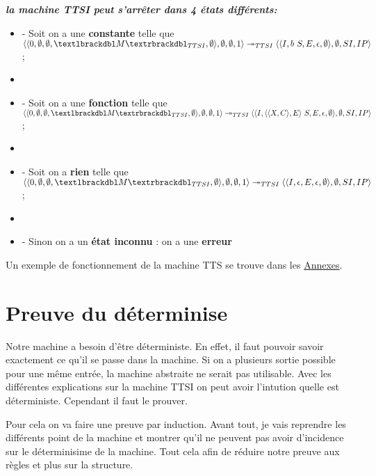 \documentclass[10pt,a4paper]{report}
\begin{document}
	
\textbf{\textit{la machine TTSI peut s'arrêter dans 4 états différents:}}
\smallbreak
\begin{itemize}
	\item[] - Soit on a une \textbf{constante} telle que 
	$\langle\langle 0,\emptyset,\emptyset,\textlbrackdbl M\textrbrackdbl_{TTSI},\emptyset\rangle,\emptyset,\emptyset,1\rangle 
	\twoheadrightarrow_{TTSI} 
	\langle\langle I,b~S,E,\epsilon,\emptyset\rangle,\emptyset,SI,IP\rangle$;
	\item[] 
	\item[] - Soit on a une \textbf{fonction} telle que
	$\langle\langle 0,\emptyset,\emptyset,\textlbrackdbl M\textrbrackdbl_{TTSI},\emptyset\rangle,\emptyset,\emptyset,1\rangle 
	\twoheadrightarrow_{TTSI} 
	\langle\langle I,\langle\langle X,C\rangle,E\rangle~S,E,\epsilon,\emptyset\rangle,\emptyset,SI,IP\rangle$;
	\item[] 
	\item[] - Soit on a \textbf{rien} telle que  
	$\langle\langle 0,\emptyset,\emptyset,\textlbrackdbl M\textrbrackdbl_{TTSI},\emptyset\rangle,\emptyset,\emptyset,1\rangle 
	\twoheadrightarrow_{TTSI} 
	\langle\langle I,\epsilon,E,\epsilon,\emptyset\rangle,\emptyset,SI,IP\rangle$;
	\item[]
	\item[] - Sinon on a un \textbf{état inconnu} : on a une \textbf{erreur} 
\end{itemize}
\bigbreak


 Un exemple de fonctionnement de la machine TTS se trouve dans les \hyperref[TTSI]{Annexes}.
\newpage
	
	\section{Preuve du déterminise}
	
	Notre machine a besoin d'être déterministe. En effet, il faut pouvoir savoir exactement ce qu'il se passe dans la machine. Si on a plusieurs sortie possible pour une même entrée, la machine abstraite ne serait pas utilisable. Avec les différentes explications sur la machine TTSI on peut avoir l'intution quelle est déterministe. Cependant il faut le prouver.
	\medbreak
	
	Pour cela on va faire une preuve par induction. Avant tout, je vais reprendre les différents point de la machine et montrer qu'il ne peuvent pas avoir d'incidence sur le déterminisime de la machine. Tout cela afin de réduire notre preuve aux règles et plus sur la structure.
	\bigbreak
	
\end{document}
